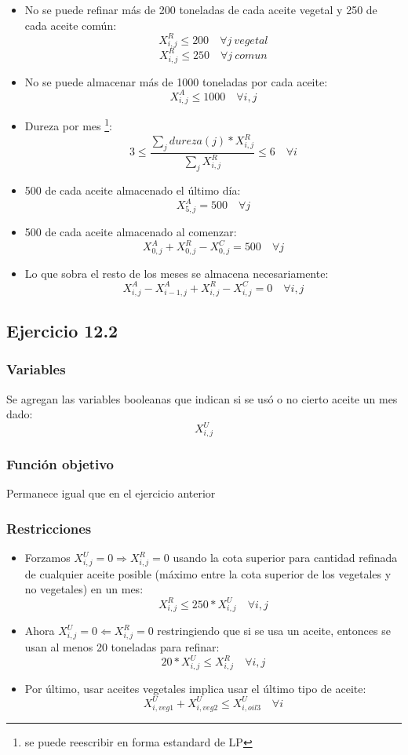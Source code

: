 \begin{itemize}
    \item No se puede refinar más de 200 toneladas de cada aceite vegetal y 250 de cada aceite común:
    $$ X^R_{i,j} \leq 200 \quad \forall j \ vegetal $$
    $$ X^R_{i,j} \leq 250 \quad \forall j \ comun $$
    \item No se puede almacenar más de 1000 toneladas por cada aceite:
    $$ X^A_{i,j} \leq 1000 \quad \forall i,j $$
    \item Dureza por mes \footnote{se puede reescribir en forma estandard de LP}:
    $$ 3 \leq \frac{\sum_{j} dureza(j)*X^R_{i,j}}{\sum_{j} X^R_{i,j}} \leq 6 \quad \forall i$$
    \item 500 de cada aceite almacenado el último día:
    $$ X^A_{5,j} = 500 \quad \forall j$$
    \item 500 de cada aceite almacenado al comenzar:
    $$ X^A_{0,j} + X^R_{0,j} - X^C_{0,j} = 500  \quad \forall j $$
    \item Lo que sobra el resto de los meses se almacena necesariamente:
    $$  X^A_{i,j} - X^A_{i-1,j} + X^R_{i,j} - X^C_{i,j} = 0 \quad \forall i,j  $$
\end{itemize}

\subsection{Ejercicio 12.2}

\subsubsection{Variables}
Se agregan las variables booleanas que indican si se usó o no cierto aceite un mes dado:
$$X^U_{i,j}$$

\subsubsection{Función objetivo}
Permanece igual que en el ejercicio anterior

\subsubsection{Restricciones}

\begin{itemize}
    \item Forzamos $X^U_{i,j} = 0 \Rightarrow X^R_{i,j} = 0$ usando la cota superior para cantidad refinada de cualquier aceite posible (máximo entre la cota superior de los vegetales y no vegetales) en un mes:
    $$ X^R_{i,j} \leq 250 * X^U_{i,j} \quad \forall i,j $$

    \item Ahora $X^U_{i,j} = 0 \Leftarrow X^R_{i,j} = 0$ restringiendo que si se usa un aceite, entonces se usan al menos 20 toneladas para refinar:
    $$ 20*X^U_{i,j} \leq X^R_{i,j}  \quad \forall i,j $$

    \item Por último, usar aceites vegetales implica usar el último tipo de aceite:
    $$ X^U_{i,veg1} + X^U_{i,veg2} \leq X^U_{i,oil3}  \quad \forall i$$
\end{itemize}

